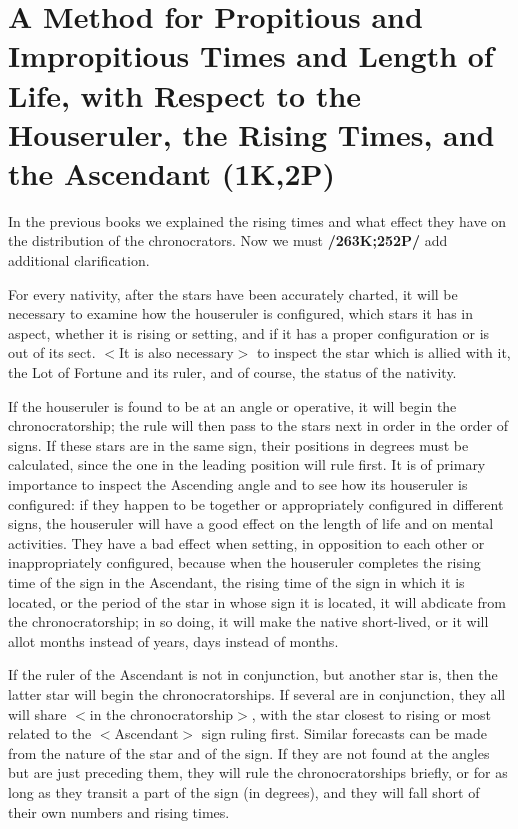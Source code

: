 \section{A Method for Propitious and Impropitious Times and Length of Life, with Respect to the Houseruler, the Rising Times, and the Ascendant (1K,2P)}

In the previous books we explained the rising times and what effect they have on the distribution of the chronocrators. Now we must \textbf{/263K;252P/} add additional clarification. 

For every nativity, after the stars  have been accurately charted, it will be necessary to examine how the houseruler is configured, which stars
it has in aspect, whether it is rising or setting, and if it has a proper configuration or is out of its sect. $<$It is also necessary$>$ to inspect the star which is allied with it, the Lot of Fortune and its ruler, and of course, the status of the nativity.

If the houseruler is found to be at an angle or operative, it will begin the chronocratorship; the rule will then pass to the stars next in order in the order of signs. If these stars are in the same sign, their positions
in degrees must be calculated, since the one in the leading position will rule first. It is of primary importance to inspect the Ascending angle and to see how its houseruler is configured: if they happen to be together or appropriately configured in different signs, the houseruler will have a good effect on the length of life and on mental activities. They have a bad effect when setting, in opposition to each other or inappropriately configured, because when the houseruler completes the rising time of the sign in the Ascendant, the rising time of the sign in which it is located, or the period of the star in whose sign it is located, it will abdicate from the chronocratorship; in so doing, it will make the native short-lived, or it will allot months instead of years, days instead of months.

If the ruler of the Ascendant is not in conjunction, but another star is, then the latter star will begin the chronocratorships. If several are in conjunction, they all will share $<$in the chronocratorship$>$, with the star closest to rising or most related to the $<$Ascendant$>$ sign ruling first. Similar forecasts can be made from the nature of the star and of the sign. If they are not found at the angles but are just preceding them, they will rule the chronocratorships briefly, or for as long as they transit a part of the sign (in degrees), and they will fall short of their own numbers and rising times.

